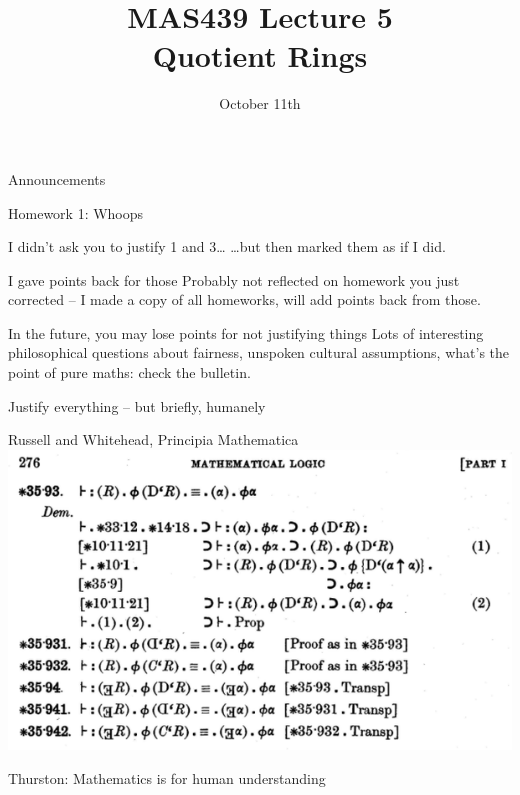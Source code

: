 \documentclass{beamer}
\title{MAS439 Lecture 5 \\ Quotient Rings}
\date{October 11th}
\begin{document}
\begin{frame}
\titlepage
\end{frame}

\begin{frame}[plain,c]

\begin{center}

\Huge

Announcements
\end{center}

\end{frame}

\begin{frame}{Homework 1: Whoops}

  \begin{block}{I didn't ask you to justify 1 and 3\dots}
    \dots but then marked them as if I did.
  \end{block}
  \begin{block}{I gave points back for those}
    Probably not reflected on homework you just corrected -- I made a copy of all homeworks, will add points back from those.
  \end{block}

  \begin{block}{In the future, you may lose points for not justifying things}
Lots of interesting philosophical questions about fairness, unspoken cultural assumptions, what's the point of pure maths: check the bulletin.

  \end{block}

  \end{frame}

\begin{frame}{Justify everything -- but briefly, humanely}
\begin{block}{Russell and Whitehead, Principia Mathematica}
  \includegraphics[width=\textwidth]{Principia.png}
\end{block}
\begin{block}{Thurston: Mathematics is for human understanding}
  \end{block}
\end{frame}
\end{document}
